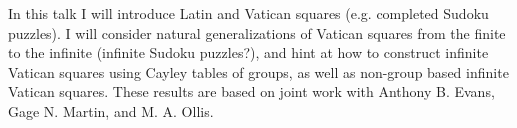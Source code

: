 In this talk I will introduce Latin and Vatican squares (e.g. completed Sudoku puzzles). I will consider natural generalizations of Vatican squares from the finite to the infinite (infinite Sudoku puzzles?), and hint at how to construct infinite Vatican squares using Cayley tables of groups, as well as non-group based infinite Vatican squares. These results are based on joint work with Anthony B. Evans, Gage N. Martin, and M. A. Ollis. 